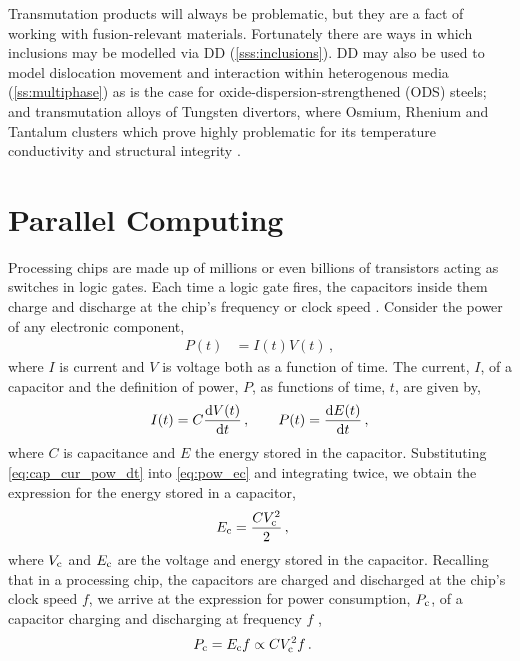 Transmutation products will always be problematic, but they are a fact of working with fusion-relevant materials. Fortunately there are ways in which inclusions may be modelled via DD (\cref{sss:inclusions}). DD may also be used to model dislocation movement and interaction within heterogenous media (\cref{ss:multiphase}) as is the case for oxide-dispersion-strengthened (ODS) steels; and transmutation alloys of Tungsten divertors, where Osmium, Rhenium and Tantalum clusters which prove highly problematic for its temperature conductivity and structural integrity \cite{w_cluster1, nirrprop, nirpropmic, nirrmic, ionirrmic, ionirrprop, ionirrprop2}.

\section{Parallel Computing}
\label{s:parallel_comp}
Processing chips are made up of millions or even billions of transistors acting as switches in logic gates. Each time a logic gate fires, the capacitors inside them charge and discharge at the chip's frequency or clock speed \cite{cpu_trnstor}. Consider the power of any electronic component,
\begin{align}
	P(t) & = I(t) V(t) \label{eq:pow_ec} \,,
\end{align}
where $ I $ is current and $ V $ is voltage both as a function of time. The current, $ I $, of a capacitor and the definition of power, $ P $, as functions of time, $ t $, are given by,
\begin{align}
	I(t) = C \dfrac{\mathrm{d}V(t)}{\textrm{d}t} \label{eq:cap_cur_pow_dt}\,, \qquad
	P(t) = \dfrac{\textrm{d}E(t)}{\textrm{d}t}\,,
\end{align}
where $ C $ is capacitance and $ E $ the energy stored in the capacitor. Substituting \cref{eq:cap_cur_pow_dt} into \cref{eq:pow_ec} and integrating twice, we obtain the expression for the energy stored in a capacitor,
\begin{align}
	E_{\textrm{c}} & = \dfrac{C V_{\textrm{c}}^{2}}{2} \label{eq:e_cap}\,,
\end{align}
where $ V_{\textrm{c}} $ and $ E_{\textrm{c}} $ are the voltage and energy stored in the capacitor. Recalling that in a processing chip, the capacitors are charged and discharged at the chip's clock speed $ f $, we arrive at the expression for power consumption, $ P_{\textrm{c}} $, of a capacitor charging and discharging at frequency $ f $ \cite{microelec},
\begin{align}
	P_{\textrm{c}} & = E_{\textrm{c}} f \propto C V_{\textrm{c}}^{2} f \label{eq:p_cap}\,.
\end{align}

